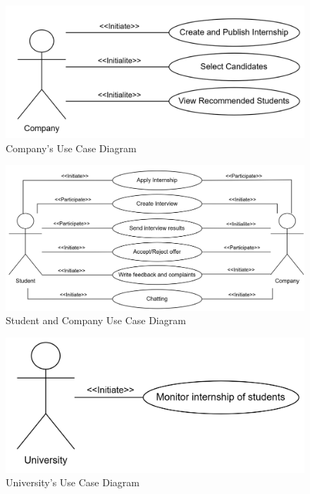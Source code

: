 \begin{figure}[H]
    \centering
    \includegraphics[width=1\textwidth]{Images/Company_diagram.png}
    \caption{Company's Use Case Diagram}
\end{figure}
\begin{figure}[H]
    \centering
    \includegraphics[width=1\textwidth]{Images/SandC_diagram.png}
    \caption{Student and Company Use Case Diagram}
\end{figure}
\begin{figure}[H]
    \centering
    \includegraphics[width=1\textwidth]{Images/University_diagram.png}
    \caption{University's Use Case Diagram}
\end{figure}

